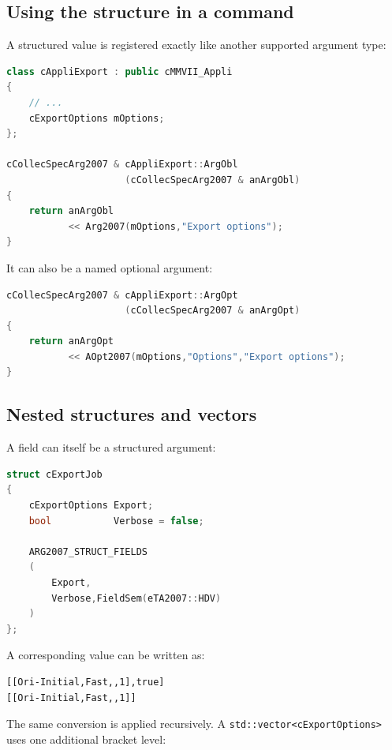 
\subsection{Using the structure in a command}

A structured value is registered exactly like another supported argument type:

\begin{lstlisting}[language=C++]
class cAppliExport : public cMMVII_Appli
{
    // ...
    cExportOptions mOptions;
};

cCollecSpecArg2007 & cAppliExport::ArgObl
                     (cCollecSpecArg2007 & anArgObl)
{
    return anArgObl
           << Arg2007(mOptions,"Export options");
}
\end{lstlisting}

It can also be a named optional argument:

\begin{lstlisting}[language=C++]
cCollecSpecArg2007 & cAppliExport::ArgOpt
                     (cCollecSpecArg2007 & anArgOpt)
{
    return anArgOpt
           << AOpt2007(mOptions,"Options","Export options");
}
\end{lstlisting}


\subsection{Nested structures and vectors}

A field can itself be a structured argument:

\begin{lstlisting}[language=C++]
struct cExportJob
{
    cExportOptions Export;
    bool           Verbose = false;

    ARG2007_STRUCT_FIELDS
    (
        Export,
        Verbose,FieldSem(eTA2007::HDV)
    )
};
\end{lstlisting}

A corresponding value can be written as:

\begin{verbatim}
[[Ori-Initial,Fast,,1],true]
[[Ori-Initial,Fast,,1]]
\end{verbatim}

The same conversion is applied recursively.  A
\texttt{std::vector<cExportOptions>} uses one additional bracket level:

